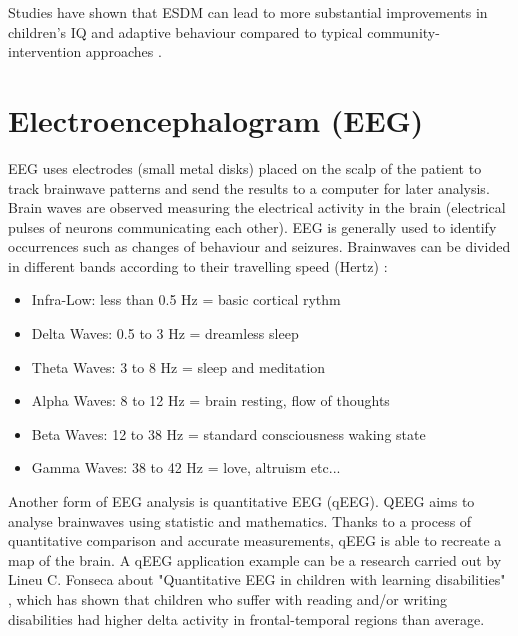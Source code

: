 Studies have shown that ESDM can lead to more substantial improvements in children's IQ and adaptive behaviour compared to typical community-intervention approaches \cite{ESDM}.

\section{Electroencephalogram (EEG)}

EEG uses electrodes (small metal disks) placed on the scalp of the patient to track brainwave patterns and send the results to a computer for later analysis. Brain waves are observed measuring the electrical activity in the brain (electrical pulses of neurons communicating each other). EEG is generally used to identify occurrences such as changes of behaviour and seizures. Brainwaves can be divided in different bands according to their travelling speed (Hertz) \cite{waves}:
\begin{itemize}
\itemsep0em
\item Infra-Low: less than 0.5 Hz = basic cortical rythm
\item Delta Waves: 0.5 to 3 Hz = dreamless sleep
\item Theta Waves: 3 to 8 Hz = sleep and meditation
\item Alpha Waves: 8 to 12 Hz = brain resting, flow of thoughts
\item Beta Waves: 12 to 38 Hz = standard consciousness waking state 
\item Gamma Waves: 38 to 42 Hz = love, altruism etc...
\end{itemize}

Another form of EEG analysis is quantitative EEG (qEEG). QEEG aims to analyse brainwaves using statistic and mathematics. Thanks to a process of quantitative comparison and accurate measurements, qEEG is able to recreate a map of the brain. A qEEG application example can be a research carried out by Lineu C. Fonseca about "Quantitative EEG in children with learning disabilities" \cite{qEEG}, which has shown that children who suffer with reading and/or writing disabilities had higher delta activity in frontal-temporal regions than average.

